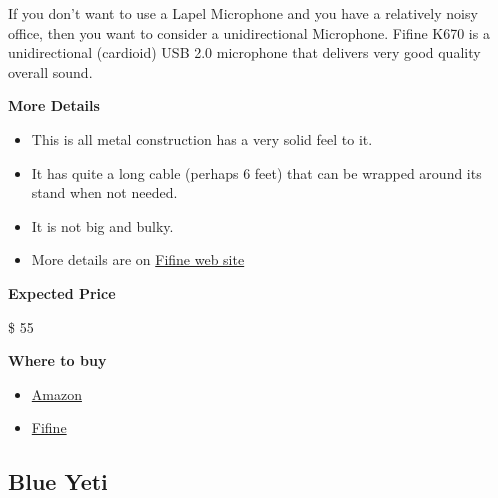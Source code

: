 \begin{gram}
\label{grm:equipment::fifine::main}
If you don't want to use a Lapel Microphone and you have a relatively
noisy office, then you want to consider a unidirectional Microphone.
Fifine K670 is a unidirectional (cardioid) USB 2.0 microphone that
delivers very good quality overall sound.

\textbf{More Details}

\begin{itemize}
\item
This is all metal construction has a very solid feel to it.
\item
It has quite a long cable (perhaps 6 feet) that can be wrapped around its stand when not needed.
\item 
It is not big and bulky.
\item
More details are on \href{https://fifinemicrophone.com/products/usb-microphone-for-mac-and-windows-k670}{Fifine web site}
\end{itemize}

\textbf{Expected Price}

\$ 55

\textbf{Where to buy}

\begin{itemize}
\item 
\href{https://www.amazon.com/Microphone-FIFINE-Computers-Podcasting-K670/dp/B079HRFH2Y/ref=asc_df_B079HRFH2Y/?tag=hyprod-20&linkCode=df0&hvadid=380013417597&hvpos=&hvnetw=g&hvrand=6999453823816156640&hvpone=&hvptwo=&hvqmt=&hvdev=c&hvdvcmdl=&hvlocint=&hvlocphy=1025202&hvtargid=pla-878206170477&psc=1&language=en_US&tag=&ref=&adgrpid=77922879259&hvpone=&hvptwo=&hvadid=380013417597&hvpos=&hvnetw=g&hvrand=6999453823816156640&hvqmt=&hvdev=c&hvdvcmdl=&hvlocint=&hvlocphy=1025202&hvtargid=pla-878206170477}{Amazon}
\item \href{https://fifinemicrophone.com/products/usb-microphone-for-mac-and-windows-k670}{Fifine}
\end{itemize}
\end{gram}

\subsection{Blue Yeti}
\label{sec:equipment::blueyeti}

